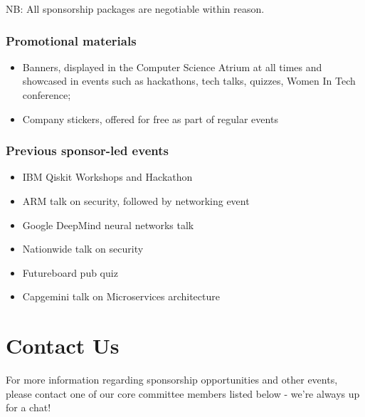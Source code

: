 \documentclass{article}
\begin{document}
NB: All sponsorship packages are negotiable within reason.

\vfill

\setlength{\columnsep}{1cm}
\begin{multicols}{2}
\subsubsection*{Promotional materials}

\medskip

\begin{itemize}
  \item Banners, displayed in the Computer Science Atrium at all times and showcased in events such as hackathons, tech talks, quizzes, Women In Tech conference;
  \item Company stickers, offered for free as part of regular events
\end{itemize}

\vfill\null
\columnbreak

\subsubsection*{Previous sponsor-led events}

\medskip

\begin{itemize}
  \item IBM Qiskit Workshops and Hackathon
  \item ARM talk on security, followed by networking event
  \item Google DeepMind neural networks talk
  \item Nationwide talk on security
  \item Futureboard pub quiz
  \item Capgemini talk on Microservices architecture
\end{itemize}
\end{multicols}

\vfill

\fontsize{13}{14}\selectfont

\section*{Contact Us}

For more information regarding sponsorship opportunities and other events,
please contact one of our core committee members listed below - we're always
up for a chat!
\end{document}

